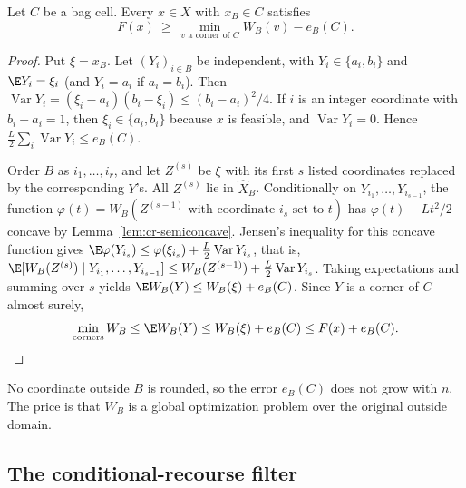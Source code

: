 \begin{lemma}\label{lem:cr-cell}
Let $C$ be a bag cell. Every $x\in X$ with $x_B\in C$ satisfies
\[
F(x)\ \ge\ \min_{v\text{ a corner of }C}W_B(v)-e_B(C).
\]
\end{lemma}
\begin{proof}
Put $\xi=x_B$. Let $(Y_i)_{i\in B}$ be independent, with $Y_i\in\{a_i,b_i\}$
and $\E Y_i=\xi_i$ (and $Y_i=a_i$ if $a_i=b_i$). Then
$\operatorname{Var}Y_i=(\xi_i-a_i)(b_i-\xi_i)\le(b_i-a_i)^2/4$. If $i$ is an
integer coordinate with $b_i-a_i=1$, then $\xi_i\in\{a_i,b_i\}$ because
$x$ is feasible, and $\operatorname{Var}Y_i=0$. Hence
$\frac L2\sum_i\operatorname{Var}Y_i\le e_B(C)$.

Order $B$ as $i_1,\ldots,i_r$, and let $Z^{(s)}$ be $\xi$ with its first $s$
listed coordinates replaced by the corresponding $Y$'s. All $Z^{(s)}$ lie
in $\widehat X_B$. Conditionally on $Y_{i_1},\ldots,Y_{i_{s-1}}$, the
function $\varphi(t)=W_B(Z^{(s-1)}\text{ with coordinate }i_s\text{ set to }t)$
has $\varphi(t)-Lt^2/2$ concave by Lemma~\ref{lem:cr-semiconcave}. Jensen's
inequality for this concave function gives
$\E\varphi(Y_{i_s})\le\varphi(\xi_{i_s})+\frac L2\operatorname{Var}Y_{i_s}$,
that is,
$\E[W_B(Z^{(s)})\mid Y_{i_1},\ldots,Y_{i_{s-1}}]
\le W_B(Z^{(s-1)})+\frac L2\operatorname{Var}Y_{i_s}$.
Taking expectations and summing over $s$ yields
$\E W_B(Y)\le W_B(\xi)+e_B(C)$. Since $Y$ is a corner of $C$ almost surely,
\[
\min_{\text{corners}}W_B\le\E W_B(Y)\le W_B(\xi)+e_B(C)\le F(x)+e_B(C).
\qedhere
\]
\end{proof}

No coordinate outside $B$ is rounded, so the error $e_B(C)$ does not grow
with $n$. The price is that $W_B$ is a global optimization problem over
the original outside domain.

\subsection{The conditional-recourse filter}\label{sec:cr-interface}

